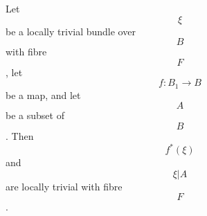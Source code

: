 Let $$\xi$$ be a locally trivial bundle over $$B$$ with fibre $$F$$, let $$f: B_1 \rightarrow B$$ be a map, and let $$A$$ be a subset of $$B$$. Then $$f^*(\xi)$$ and $$\xi|A$$ are locally trivial with fibre $$F$$.
